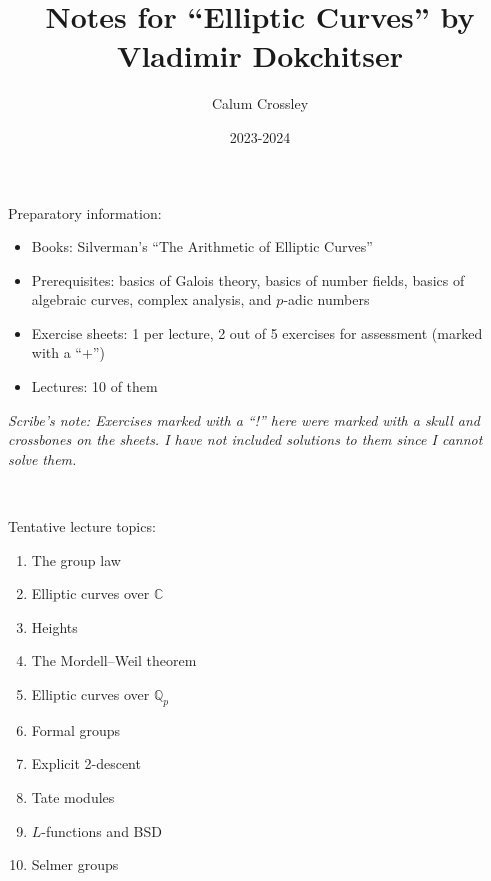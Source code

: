\documentclass[a4paper]{article}
\title{Notes for ``Elliptic Curves'' by Vladimir Dokchitser}
\author{Calum Crossley}
\date{2023-2024}
\theoremstyle{definition}
\newcommand{\Q}{\mathbb{Q}}
\newcommand{\C}{\mathbb{C}}
\begin{document}
\maketitle

Preparatory information:
\begin{itemize}
    \item Books: Silverman's ``The Arithmetic of Elliptic Curves''
    \item Prerequisites: basics of Galois theory, basics of number fields,
        basics of algebraic curves, complex analysis, and $p$-adic numbers
    \item Exercise sheets: 1 per lecture, 2 out of 5 exercises for assessment
        (marked with a ``+'')
    \item Lectures: 10 of them
\end{itemize}

\textit{Scribe's note: Exercises marked with a ``!'' here were marked with a
    skull and crossbones on the sheets. I have not included solutions to them
    since I cannot solve them.}

~

Tentative lecture topics:
\begin{enumerate}[label=\arabic*)]
    \item The group law
    \item Elliptic curves over $\C$
    \item Heights
    \item The Mordell--Weil theorem
    \item Elliptic curves over $\Q_p$
    \item Formal groups
    \item Explicit 2-descent
    \item Tate modules
    \item $L$-functions and BSD
    \item Selmer groups
\end{enumerate}
\end{document}
